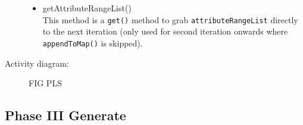 \begin{description}
\begin{itemize}
	\item{getAttributeRangeList()} \\
	This method is a \texttt{get()} method to grab \texttt{attributeRangeList} directly to the next iteration (only used for second iteration onwards where \texttt{appendToMap()} is skipped). 
	
\end{itemize}


\item[Activity diagram: ] 

FIG PLS
\end{description}

\subsection{Phase III Generate}

